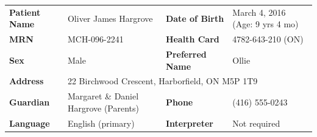 \documentclass[11pt,a4paper]{article}
\newcommand{\fieldlabel}[1]{{\footnotesize\color{GrayText}\textbf{#1}}}
\newcommand{\fieldval}[1]{{\small #1}}
\begin{document}
\vspace{4mm}

\begin{tcolorbox}[pednote, title={\faUser\enspace Patient Demographics}]
  \begin{tabularx}{\linewidth}{@{} l X l X @{}}
    \fieldlabel{Patient Name}  & \fieldval{Oliver James Hargrove} &
    \fieldlabel{Date of Birth} & \fieldval{March 4, 2016 (Age: 9 yrs 4 mo)} \\[4pt]
    \fieldlabel{MRN}           & \fieldval{MCH-096-2241} &
    \fieldlabel{Health Card}   & \fieldval{4782-643-210 (ON)} \\[4pt]
    \fieldlabel{Sex}           & \fieldval{Male} &
    \fieldlabel{Preferred Name}& \fieldval{Ollie} \\[4pt]
    \fieldlabel{Address}       & \multicolumn{3}{l}{\fieldval{22 Birchwood Crescent, Harborfield, ON M5P 1T9}} \\[4pt]
    \fieldlabel{Guardian}      & \fieldval{Margaret \& Daniel Hargrove (Parents)} &
    \fieldlabel{Phone}         & \fieldval{(416) 555-0243} \\[4pt]
    \fieldlabel{Language}      & \fieldval{English (primary)} &
    \fieldlabel{Interpreter}   & \fieldval{Not required} \\
  \end{tabularx}
\end{tcolorbox}

\vspace{3mm}
\end{document}

